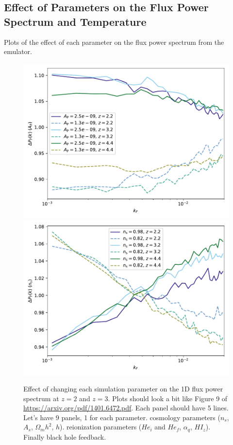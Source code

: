 \documentclass[a4paper,11pt]{article}
\begin{document}
\subsection{Effect of Parameters on the Flux Power Spectrum and Temperature}
\label{sec:singleparams}

Plots of the effect of each parameter on the flux power spectrum from the emulator.

\begin{figure}
    \centering
	\includegraphics[width=0.48\columnwidth]{figures/single_param_Ap.pdf}
		\includegraphics[width=0.48\columnwidth]{figures/single_param_ns.pdf}

    \caption{Effect of changing each simulation parameter on the 1D flux power spectrum at $z=2$ and $z=3$. Plots should look a bit like Figure 9 of \url{https://arxiv.org/pdf/1401.6472.pdf}. Each panel should have 5 lines. Let's have $9$ panels, 1 for each parameter. cosmology parameters ($n_s$, $A_s$, $\Omega_m h^2$, $h$). reionization parameters ($He_i$ and $He_f$, $\alpha_q$, $HI_z$). Finally black hole feedback. }
    \label{fig:Apnsfluxpower}
\end{figure}
\end{document}
